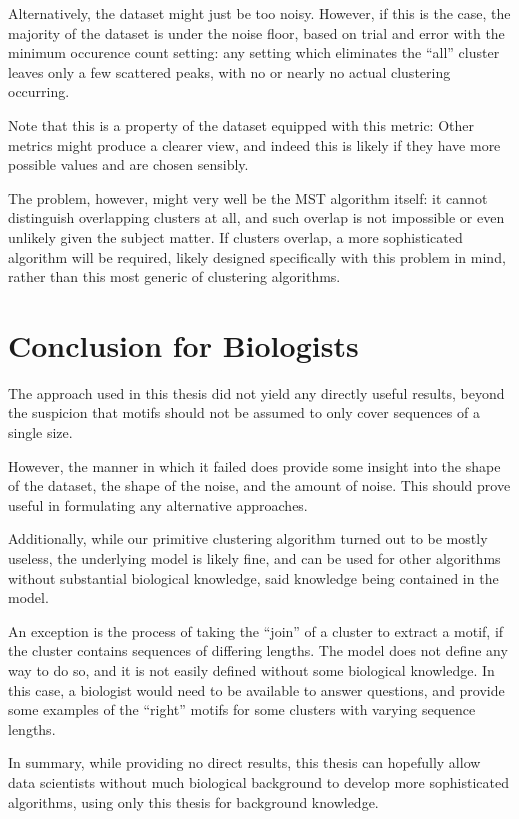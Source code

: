 \documentclass[fleqn]{book}
\begin{document}
Alternatively, the dataset might just be too noisy. However, if this is
the case, the majority of the dataset is under the noise floor, based on
trial and error with the minimum occurence count setting: any setting
which eliminates the ``all'' cluster leaves only a few scattered peaks,
with no or nearly no actual clustering occurring.

Note that this is a property of the dataset equipped with this metric:
Other metrics might produce a clearer view, and indeed this is likely if
they have more possible values and are chosen sensibly.

The problem, however, might very well be the MST algorithm itself: it
cannot distinguish overlapping clusters at all, and such overlap is not
impossible or even unlikely given the subject matter. If clusters
overlap, a more sophisticated algorithm will be required, likely
designed specifically with this problem in mind, rather than this most
generic of clustering algorithms.

\section{Conclusion for Biologists}\label{conclusion-for-biologists}

The approach used in this thesis did not yield any directly useful
results, beyond the suspicion that motifs should not be assumed to only
cover sequences of a single size.

However, the manner in which it failed does provide some insight into
the shape of the dataset, the shape of the noise, and the amount of
noise. This should prove useful in formulating any alternative
approaches.

Additionally, while our primitive clustering algorithm turned out to be
mostly useless, the underlying model is likely fine, and can be used for
other algorithms without substantial biological knowledge, said
knowledge being contained in the model.

An exception is the process of taking the ``join'' of a cluster to
extract a motif, if the cluster contains sequences of differing lengths.
The model does not define any way to do so, and it is not easily defined
without some biological knowledge. In this case, a biologist would need
to be available to answer questions, and provide some examples of the
``right'' motifs for some clusters with varying sequence lengths.

In summary, while providing no direct results, this thesis can hopefully
allow data scientists without much biological background to develop more
sophisticated algorithms, using only this thesis for background
knowledge.
\end{document}
